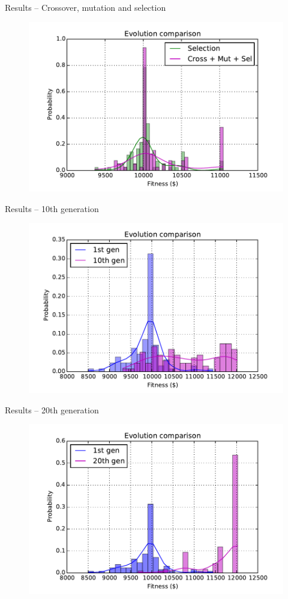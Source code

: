 \documentclass[12pt,portuguese]{beamer}
\begin{document}
\begin{frame}{Results -- Crossover, mutation and selection}
	\begin{figure}[h]
	\centering
	\includegraphics[width=0.9\columnwidth]{images/01r_100_cr_mut_sel.pdf}
	\end{figure}
\end{frame}

\begin{frame}{Results -- 10th generation}
	\begin{figure}[h]
	\centering
	\includegraphics[width=0.9\columnwidth]{images/10r_100.pdf}
	\end{figure}
\end{frame}

\begin{frame}{Results -- 20th generation}
	\begin{figure}[h]
	\centering
	\includegraphics[width=0.9\columnwidth]{images/20r_100.pdf}
	\end{figure}
\end{frame}
\end{document}
